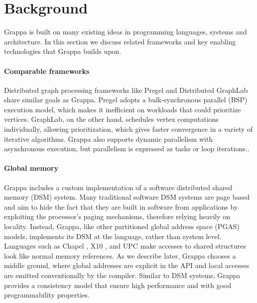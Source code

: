 \section{Background}

Grappa is built on many existing ideas in programming languages, systems and
architecture. In this section we discuss related frameworks and key enabling
technologies that Grappa builds upon.

\paragraph{Comparable frameworks} Distributed graph processing frameworks like
Pregel \cite{pregel:2010} and Distributed GraphLab \cite{distgraphlab:vldb12}
share similar goals as Grappa. Pregel adopts a bulk-synchronous parallel (BSP)
execution model, which makes it inefficient on workloads that could prioritize
vertices. GraphLab, on the other hand, schedules vertex computations
individually, allowing prioritization, which gives faster convergence in a
variety of iterative algorithms. Grappa also
supports dynamic parallelism with asynchronous execution, but parallelism is
expressed as tasks or loop iterations..

\paragraph{Global memory} Grappa includes a custom implementation of a
software distributed shared memory (DSM) system. Many traditional software DSM
systems are page based~\cite{Treadmarks,munin} and aim to hide the fact that
they are built in software from applications by exploiting the processor's
paging mechanisms, therefore relying heavily on locality. Instead, Grappa,
like other partitioned global address space (PGAS) models, implements its DSM
at the language, rather than system level. Languages such as Chapel
\cite{Chamberlain:2007}, X10 \cite{X10:2005}, and UPC \cite{upc:2005} make accesses to shared
structures look like normal memory references. As we describe later, Grappa
chooses a middle ground, where global addresses are explicit in the API and
local accesses are emitted conventionally by the compiler. Similar to DSM
systems, Grappa provides a consistency model that ensure high performance and
with good programmability properties. %


